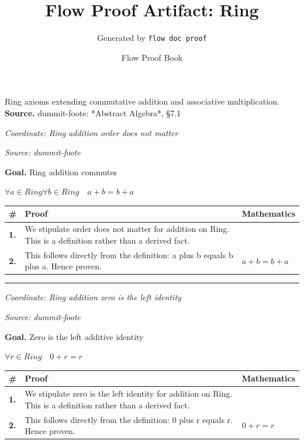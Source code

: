 \documentclass[11pt]{article}
\title{Flow Proof Artifact: Ring}
\author{Generated by \texttt{flow doc proof}}
\date{Flow Proof Book}
\theoremstyle{definition}
\begin{document}
\maketitle
Ring axioms extending commutative addition and associative multiplication.\\[0.5em]
\textbf{Source.} dummit-foote: *Abstract Algebra*, §7.1\\[0.5em]
\bigskip
{}\par
\smallskip\noindent\textit{Coordinate: Ring \cdot addition \cdot order does not matter}\par
\smallskip\noindent\textit{Source: dummit-foote}\par
\medskip
\noindent\textbf{Goal.} Ring addition commutes\par
\noindent$\displaystyle \forall a \in Ring \forall b \in Ring\quad a + b = b + a$\par
\medskip
\noindent
\begin{tabular}{@{} >{\raggedright\arraybackslash}p{} >{\raggedright\arraybackslash}p{} >{\raggedleft\arraybackslash}p{} @{}}
\textbf{\#} & \textbf{Proof} & \textbf{Mathematics} \\
\midrule
\textbf{1.} & We stipulate order does not matter for addition on Ring. This is a definition rather than a derived fact. & \\[0.45em]
\textbf{2.} & This follows directly from the definition: a plus b equals b plus a. Hence proven. & $\displaystyle a + b = b + a$ \\[0.45em]
\bottomrule
\end{tabular}
\label{thm:Ring-addition-order_does_not_matter}
\par\medskip\hrule
\bigskip
{}\par
\smallskip\noindent\textit{Coordinate: Ring \cdot addition \cdot zero is the left identity}\par
\smallskip\noindent\textit{Source: dummit-foote}\par
\medskip
\noindent\textbf{Goal.} Zero is the left additive identity\par
\noindent$\displaystyle \forall r \in Ring\quad 0 + r = r$\par
\medskip
\noindent
\begin{tabular}{@{} >{\raggedright\arraybackslash}p{} >{\raggedright\arraybackslash}p{} >{\raggedleft\arraybackslash}p{} @{}}
\textbf{\#} & \textbf{Proof} & \textbf{Mathematics} \\
\midrule
\textbf{1.} & We stipulate zero is the left identity for addition on Ring. This is a definition rather than a derived fact. & \\[0.45em]
\textbf{2.} & This follows directly from the definition: 0 plus r equals r. Hence proven. & $\displaystyle 0 + r = r$ \\[0.45em]
\bottomrule
\end{tabular}
\end{document}
